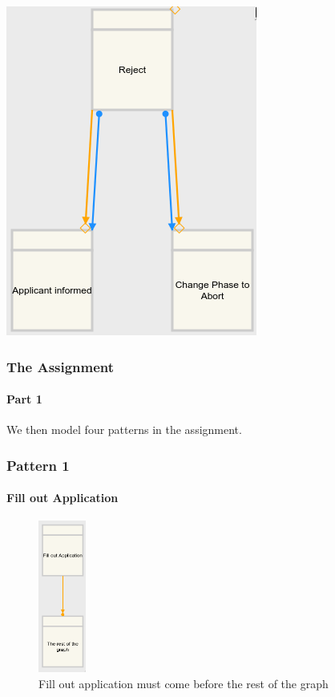 \documentclass{beamer}
\begin{document}
\begin{frame}[t]
\begin{minipage}[c]{0.5\textwidth}
            \includegraphics[width=0.8\linewidth]{images/dcrex1.png}
        \end{minipage}
    \end{frame}
    \begin{frame}[t]
        \frametitle{The Assignment}
        \framesubtitle{Part 1}
        We then model four patterns in the assignment.
    \end{frame}
    \begin{frame}[t]
        \frametitle{Pattern 1}
        \framesubtitle{Fill out Application}
        \begin{figure}[!h]
            \centering
            \includegraphics[height=5cm]{images/dcpat1.png}
            \caption{Fill out application must come before the rest of the graph}
            \label{fig:a1}
        \end{figure}
    \end{frame}
\end{document}
